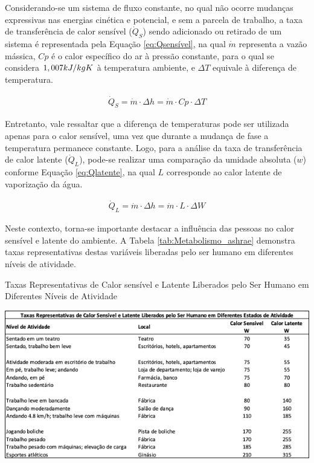 \documentclass[acronym,symbols,table]{fei}
\begin{document}
Considerando-se um sistema de fluxo constante, no qual não ocorre mudanças expressivas nas energias cinética e potencial, e sem a parcela de trabalho, a taxa de transferência de calor sensível ($\dot{Q}_{S}$) sendo adicionado ou retirado de um sistema é representada pela Equação \ref{eq:Qsensível}, na qual $\dot{m}$ representa a vazão mássica, ${Cp}$ é o calor específico do ar à pressão constante, para o qual se considera $1,007 \space kJ/kg K$ à temperatura ambiente, e $\Delta{T}$ equivale à diferença de temperatura.  

\begin{equation} \label{eq:Qsensível}
\begin{aligned}
    \dot{Q}_{S}=\dot{m} \cdot \Delta{h}= \dot{m} \cdot Cp \cdot \Delta{T}
\end{aligned}
\end{equation}

Entretanto, vale ressaltar que a diferença de temperaturas pode ser utilizada apenas para o calor sensível, uma vez que durante a mudança de fase a temperatura permanece constante. Logo, para a análise da taxa de transferência de calor latente ($\dot{Q}_{L}$), pode-se realizar uma comparação da umidade absoluta ($w$) conforme Equação \ref{eq:Qlatente}, na qual $L$ corresponde ao calor latente de vaporização da água.

\begin{equation} \label{eq:Qlatente}
\begin{aligned}
    \dot{Q}_{L}=\dot{m} \cdot \Delta{h}= \dot{m} \cdot L \cdot \Delta{W}
\end{aligned}
\end{equation}

Neste contexto, torna-se importante destacar a influência das pessoas no calor sensível e latente do ambiente. A Tabela \ref{tab:Metabolismo_ashrae} demonstra taxas representativas destas variáveis liberadas pelo ser humano em diferentes níveis de atividade.

\begin{table}[!htb] 
 \centering
    \caption{Taxas Representativas de Calor sensível e Latente Liberados pelo Ser Humano em Diferentes Níveis de Atividade}
    \includegraphics[width=1.0\linewidth]{Tabelas/Metabolismo_ashrae.png}
    \label{tab:Metabolismo_ashrae}
\end{table}
\end{document}
